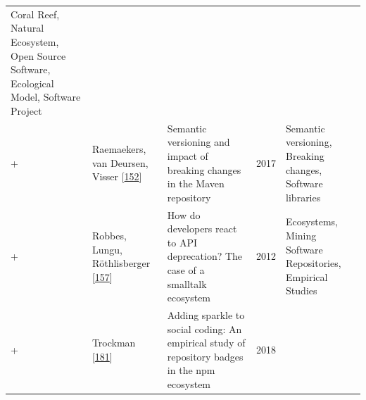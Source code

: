 \documentclass[]{book}
\begin{document}
\begin{longtable}[]{@{}lllll@{}}
\begin{minipage}[t]{0.39\columnwidth}
Coral Reef, Natural Ecosystem, Open Source Software, Ecological Model,
Software Project\strut
\end{minipage}\tabularnewline
\begin{minipage}[t]{0.01\columnwidth}\raggedright\strut
+\strut
\end{minipage} & \begin{minipage}[t]{0.09\columnwidth}\raggedright\strut
Raemaekers, van Deursen, Visser
{[}\protect\hyperlink{ref-Raemaekers2017}{152}{]}\strut
\end{minipage} & \begin{minipage}[t]{0.34\columnwidth}\raggedright\strut
Semantic versioning and impact of breaking changes in the Maven
repository\strut
\end{minipage} & \begin{minipage}[t]{0.02\columnwidth}\raggedright\strut
2017\strut
\end{minipage} & \begin{minipage}[t]{0.39\columnwidth}\raggedright\strut
Semantic versioning, Breaking changes, Software libraries\strut
\end{minipage}\tabularnewline
\begin{minipage}[t]{0.01\columnwidth}\raggedright\strut
+\strut
\end{minipage} & \begin{minipage}[t]{0.09\columnwidth}\raggedright\strut
Robbes, Lungu, Röthlisberger
{[}\protect\hyperlink{ref-Robbes2012}{157}{]}\strut
\end{minipage} & \begin{minipage}[t]{0.34\columnwidth}\raggedright\strut
How do developers react to API deprecation? The case of a smalltalk
ecosystem\strut
\end{minipage} & \begin{minipage}[t]{0.02\columnwidth}\raggedright\strut
2012\strut
\end{minipage} & \begin{minipage}[t]{0.39\columnwidth}\raggedright\strut
Ecosystems, Mining Software Repositories, Empirical Studies\strut
\end{minipage}\tabularnewline
\begin{minipage}[t]{0.01\columnwidth}\raggedright\strut
+\strut
\end{minipage} & \begin{minipage}[t]{0.09\columnwidth}\raggedright\strut
Trockman {[}\protect\hyperlink{ref-Trockman2018}{181}{]}\strut
\end{minipage} & \begin{minipage}[t]{0.34\columnwidth}\raggedright\strut
Adding sparkle to social coding: An empirical study of repository badges
in the npm ecosystem\strut
\end{minipage} & \begin{minipage}[t]{0.02\columnwidth}\raggedright\strut
2018\strut
\end{minipage} & \begin{minipage}[t]{0.39\columnwidth}\raggedright\strut
\strut
\end{minipage}\tabularnewline
\bottomrule
\end{longtable}
\end{document}
